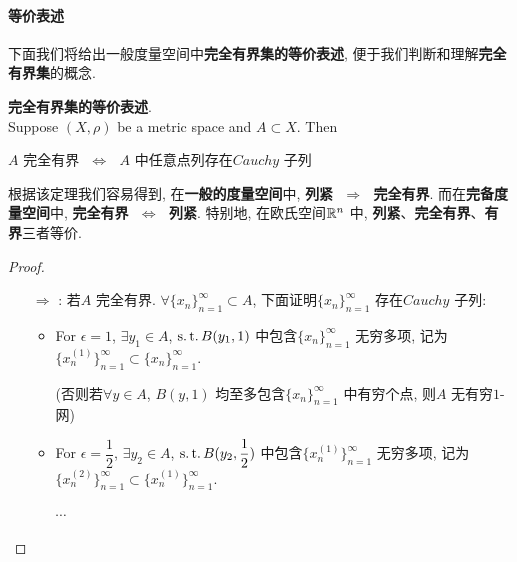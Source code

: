 \vspace*{6em}
\paragraph{等价表述}
	下面我们将给出一般度量空间中\textbf{完全有界集的等价表述}, 便于我们判断和理解\textbf{完全有界集}的概念.
	
	\newpage
	\begin{thm}\label{thm 1.4.1}
		\textbf{完全有界集的等价表述}. \\
		Suppose $(X , \rho)$ be a metric space and $A \subset X$. Then
		\begin{center}
			$A$ 完全有界 $\,\, \Leftrightarrow \,\,$ $A$ 中任意点列存在$Cauchy$ 子列
		\end{center}
		
		\vspace*{2em}
		
		\begin{rmk}
			根据该定理我们容易得到, 在\textbf{一般的度量空间}中, \textbf{列紧} $\,\, \Rightarrow \,\,$ \textbf{完全有界}. 而在\textbf{完备度量空间}中, \textbf{完全有界} $\,\, \Leftrightarrow \,\,$ \textbf{列紧}. 特别地, 在欧氏空间$\mathbb{R}^n$ 中, \textbf{列紧}、\textbf{完全有界}、\textbf{有界}三者等价.
		\end{rmk}
		
		\vspace*{2em}
		
		\begin{proof}
			\begin{enumerate}
				\item[$\Rightarrow$]: 若$A$ 完全有界. $\forall \{ x_n \}_{n = 1}^{\infty} \subset A$, 下面证明$\{ x_n \}_{n = 1}^{\infty}$ 存在$Cauchy$ 子列: 
				
				\vspace*{1em}
				
				\begin{itemize}
					\item For $\epsilon = 1$, $\exists y_1 \in A$, $\operatorname{s.t.} B(y_1 , 1)$ 中包含$\{ x_n \}_{n = 1}^{\infty}$ 无穷多项, 记为$\{ x_{n}^{(1)} \}_{n = 1}^{\infty} \subset \{ x_n \}_{n = 1}^{\infty}$.
					\begin{center}
						(否则若$\forall y \in A$, $B(y , 1)$ 均至多包含$\{ x_n \}_{n = 1}^{\infty}$ 中有穷个点, 则$A$ 无有穷$1$-网)
					\end{center}
				
					\vspace*{1em}
					
					\item For $\epsilon = \dfrac{1}{2}$, $\exists y_2 \in A$, $\operatorname{s.t.} B(y_2 , \dfrac{1}{2})$ 中包含$\{ x_{n}^{(1)} \}_{n = 1}^{\infty}$ 无穷多项, 记为$\{ x_{n}^{(2)} \}_{n = 1}^{\infty} \subset \{ x_{n}^{(1)} \}_{n = 1}^{\infty}$.
					\begin{center}
						$\cdots$
					\end{center}
					

\end{itemize}
\end{enumerate}
\end{proof}
\end{thm}
